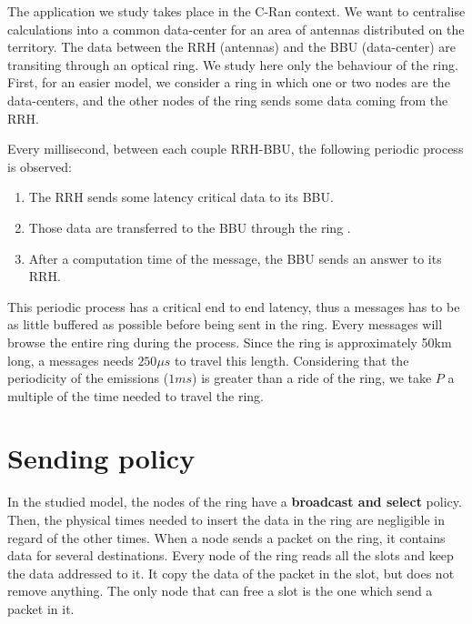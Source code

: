 \documentclass[a4paper,10pt]{article}
\begin{document}
	
	
	
	
The application we study takes place in the C-Ran context. We want to centralise calculations into a common data-center for an area of antennas distributed on the territory. The data between the RRH (antennas) and the BBU (data-center) are transiting through an optical ring. We study here only the behaviour of the ring. First, for an easier model, we consider a ring in which one or two nodes are the data-centers, and the other nodes of the ring sends some data coming from the RRH.

Every millisecond, between each couple RRH-BBU, the following periodic process is observed:
\begin{enumerate}
 \item The RRH sends some latency critical data to its BBU.
 \item Those data are transferred to the BBU through the ring .
 \item After a computation time of the message, the BBU sends an answer to its RRH.
\end{enumerate}
 This periodic process has a critical end to end latency, thus a messages has to be as little buffered as possible before being sent in the ring.
 Every messages will browse the entire ring during the process. Since the ring is approximately 50km long, a messages needs $250 \mu s$ to travel this length.
 Considering that the periodicity of the emissions ($1ms$) is greater than a ride of the ring, we take $P$ a multiple of the time needed to travel the ring.
 
 
 
\section*{Sending policy}
In the studied model, the nodes of the ring have a {\bf broadcast and select} policy. Then, the physical times needed to insert the data in the ring are negligible in regard of the other times.
When a node sends a packet on the ring, it contains data for several destinations. Every node of the ring reads all the slots and keep the data addressed to it. It copy the data of the packet in the slot, but does not remove anything. The only node that can free a slot is the one which send a packet in it.

\end{document}
